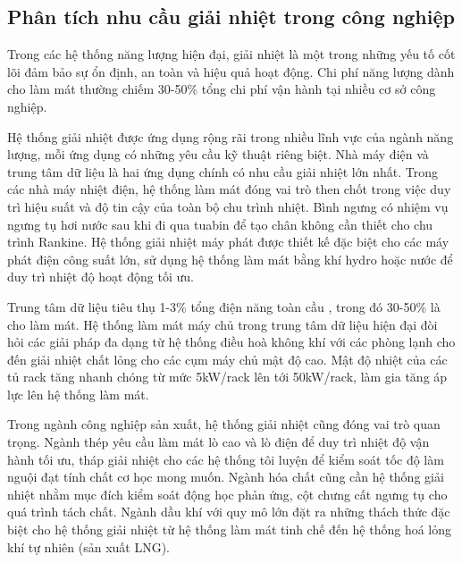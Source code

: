\documentclass[../main.tex]{subfiles}
\begin{document}
\subsection{Phân tích nhu cầu giải nhiệt trong công nghiệp}
\label{sec:industrial_cooling_needs_analysis}

Trong các hệ thống năng lượng hiện đại, giải nhiệt là một trong những yếu tố cốt lõi đảm bảo sự ổn định, an toàn và hiệu quả hoạt động. Chi phí năng lượng dành cho làm mát thường chiếm 30-50\% tổng chi phí vận hành tại nhiều cơ sở công nghiệp.

Hệ thống giải nhiệt được ứng dụng rộng rãi trong nhiều lĩnh vực của ngành năng lượng, mỗi ứng dụng có những yêu cầu kỹ thuật riêng biệt. Nhà máy điện và trung tâm dữ liệu là hai ứng dụng chính có nhu cầu giải nhiệt lớn nhất. Trong các nhà máy nhiệt điện, hệ thống làm mát đóng vai trò then chốt trong việc duy trì hiệu suất và độ tin cậy của toàn bộ chu trình nhiệt. Bình ngưng có nhiệm vụ ngưng tụ hơi nước sau khi đi qua tuabin để tạo chân không cần thiết cho chu trình Rankine. Hệ thống giải nhiệt máy phát được thiết kế đặc biệt cho các máy phát điện công suất lớn, sử dụng hệ thống làm mát bằng khí hydro hoặc nước để duy trì nhiệt độ hoạt động tối ưu.

Trung tâm dữ liệu tiêu thụ 1-3\% tổng điện năng toàn cầu \cite{iea2022datacenter}, trong đó 30-50\% là cho làm mát. Hệ thống làm mát máy chủ trong trung tâm dữ liệu hiện đại đòi hỏi các giải pháp đa dạng từ hệ thống điều hoà không khí với các phòng lạnh cho đến giải nhiệt chất lỏng cho các cụm máy chủ mật độ cao. Mật độ nhiệt của các tủ rack tăng nhanh chóng từ mức 5kW/rack lên tới 50kW/rack, làm gia tăng áp lực lên hệ thống làm mát.

Trong ngành công nghiệp sản xuất, hệ thống giải nhiệt cũng đóng vai trò quan trọng. Ngành thép yêu cầu làm mát lò cao và lò điện để duy trì nhiệt độ vận hành tối ưu, tháp giải nhiệt cho các hệ thống tôi luyện để kiểm soát tốc độ làm nguội đạt tính chất cơ học mong muốn. Ngành hóa chất cũng cần hệ thống giải nhiệt nhằm mục đích kiểm soát động học phản ứng, cột chưng cất ngưng tụ cho quá trình tách chất. Ngành dầu khí với quy mô lớn đặt ra những thách thức đặc biệt cho hệ thống giải nhiệt từ hệ thống làm mát tinh chế đến hệ thống hoá lỏng khí tự nhiên (sản xuất LNG).
\end{document}
